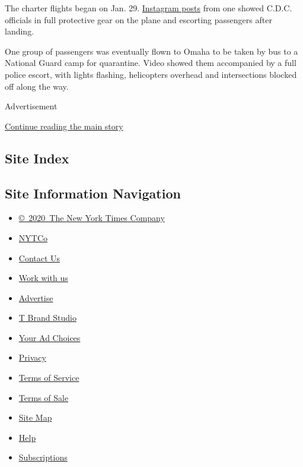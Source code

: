 The charter flights began on Jan. 29.
\href{https://www.3newsnow.com/news/local-news/inside-the-wuhan-evacuation-to-omaha}{Instagram
posts} from one showed C.D.C. officials in full protective gear on the
plane and escorting passengers after landing.

One group of passengers was eventually flown to Omaha to be taken by bus
to a National Guard camp for quarantine. Video showed them accompanied
by a full police escort, with lights flashing, helicopters overhead and
intersections blocked off along the way.

Advertisement

\protect\hyperlink{after-bottom}{Continue reading the main story}

\hypertarget{site-index}{%
\subsection{Site Index}\label{site-index}}

\hypertarget{site-information-navigation}{%
\subsection{Site Information
Navigation}\label{site-information-navigation}}

\begin{itemize}
\tightlist
\item
  \href{https://help.nytimes3xbfgragh.onion/hc/en-us/articles/115014792127-Copyright-notice}{©~2020~The
  New York Times Company}
\end{itemize}

\begin{itemize}
\tightlist
\item
  \href{https://www.nytco.com/}{NYTCo}
\item
  \href{https://help.nytimes3xbfgragh.onion/hc/en-us/articles/115015385887-Contact-Us}{Contact
  Us}
\item
  \href{https://www.nytco.com/careers/}{Work with us}
\item
  \href{https://nytmediakit.com/}{Advertise}
\item
  \href{http://www.tbrandstudio.com/}{T Brand Studio}
\item
  \href{https://www.nytimes3xbfgragh.onion/privacy/cookie-policy\#how-do-i-manage-trackers}{Your
  Ad Choices}
\item
  \href{https://www.nytimes3xbfgragh.onion/privacy}{Privacy}
\item
  \href{https://help.nytimes3xbfgragh.onion/hc/en-us/articles/115014893428-Terms-of-service}{Terms
  of Service}
\item
  \href{https://help.nytimes3xbfgragh.onion/hc/en-us/articles/115014893968-Terms-of-sale}{Terms
  of Sale}
\item
  \href{https://spiderbites.nytimes3xbfgragh.onion}{Site Map}
\item
  \href{https://help.nytimes3xbfgragh.onion/hc/en-us}{Help}
\item
  \href{https://www.nytimes3xbfgragh.onion/subscription?campaignId=37WXW}{Subscriptions}
\end{itemize}
